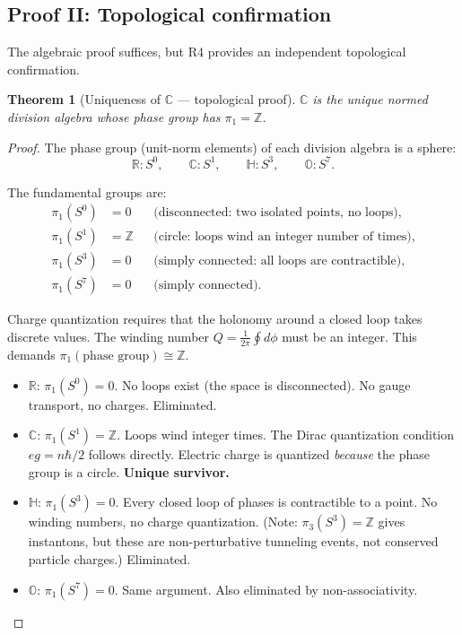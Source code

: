 \documentclass[12pt]{article}
\newtheorem{theorem}{Theorem}[section]
\theoremstyle{remark}
\theoremstyle{definition}
\begin{document}
\subsection{Proof II: Topological confirmation}

The algebraic proof suffices, but R4 provides an independent topological confirmation.

\begin{theorem}[Uniqueness of $\mathbb{C}$ --- topological proof]
\label{thm:C_topology}
$\mathbb{C}$ is the unique normed division algebra whose phase group has $\pi_1 = \mathbb{Z}$.
\end{theorem}

\begin{proof}
The phase group (unit-norm elements) of each division algebra is a sphere:
\begin{equation}
\mathbb{R}: S^0, \qquad \mathbb{C}: S^1, \qquad \mathbb{H}: S^3, \qquad \mathbb{O}: S^7.
\end{equation}

The fundamental groups are:
\begin{align}
\pi_1(S^0) &= 0 &&\text{(disconnected: two isolated points, no loops)}, \\
\pi_1(S^1) &= \mathbb{Z} &&\text{(circle: loops wind an integer number of times)}, \\
\pi_1(S^3) &= 0 &&\text{(simply connected: all loops are contractible)}, \\
\pi_1(S^7) &= 0 &&\text{(simply connected)}.
\end{align}

Charge quantization requires that the holonomy around a closed loop takes discrete values. The winding number $Q = \frac{1}{2\pi}\oint d\phi$ must be an integer. This demands $\pi_1(\text{phase group}) \cong \mathbb{Z}$.

\begin{itemize}
\item \textbf{$\mathbb{R}$}: $\pi_1(S^0) = 0$. No loops exist (the space is disconnected). No gauge transport, no charges. Eliminated.
\item \textbf{$\mathbb{C}$}: $\pi_1(S^1) = \mathbb{Z}$. Loops wind integer times. The Dirac quantization condition $eg = n\hbar/2$ follows directly. Electric charge is quantized \emph{because} the phase group is a circle. \textbf{Unique survivor.}
\item \textbf{$\mathbb{H}$}: $\pi_1(S^3) = 0$. Every closed loop of phases is contractible to a point. No winding numbers, no charge quantization. (Note: $\pi_3(S^3) = \mathbb{Z}$ gives instantons, but these are non-perturbative tunneling events, not conserved particle charges.) Eliminated.
\item \textbf{$\mathbb{O}$}: $\pi_1(S^7) = 0$. Same argument. Also eliminated by non-associativity. \qedhere
\end{itemize}
\end{proof}
\end{document}
